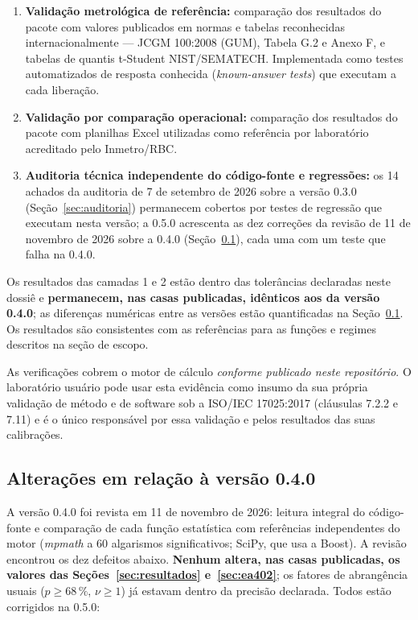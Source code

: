 \documentclass[11pt,a4paper]{article}
\newcommand{\docVersion}{0.5.0}
\newcommand{\auditDate}{7 de setembro de 2026}
\newcommand{\previousVersion}{0.4.0}
\newcommand{\auditedVersion}{0.3.0}
\newcommand{\reviewDate}{11 de novembro de 2026}
\begin{document}
\begin{enumerate}
  \item \textbf{Validação metrológica de referência:} comparação dos resultados do pacote com valores publicados em normas e tabelas reconhecidas internacionalmente --- JCGM 100:2008 (GUM), Tabela G.2 e Anexo F, e tabelas de quantis t-Student NIST/SEMATECH. Implementada como testes automatizados de resposta conhecida (\emph{known-answer tests}) que executam a cada liberação.
  \item \textbf{Validação por comparação operacional:} comparação dos resultados do pacote com planilhas Excel utilizadas como referência por laboratório acreditado pelo Inmetro/RBC.
  \item \textbf{Auditoria técnica independente do código-fonte e regressões:} os 14 achados da auditoria de \auditDate{} sobre a versão \auditedVersion{} (Seção~\ref{sec:auditoria}) permanecem cobertos por testes de regressão que executam nesta versão; a \docVersion{} acrescenta as dez correções da revisão de \reviewDate{} sobre a \previousVersion{} (Seção~\ref{sec:delta}), cada uma com um teste que falha na \previousVersion{}.
\end{enumerate}

Os resultados das camadas 1 e 2 estão dentro das tolerâncias declaradas neste dossiê e \textbf{permanecem, nas casas publicadas, idênticos aos da versão \previousVersion{}}; as diferenças numéricas entre as versões estão quantificadas na Seção~\ref{sec:delta}. Os resultados são consistentes com as referências para as funções e regimes descritos na seção de escopo.

As verificações cobrem o motor de cálculo \emph{conforme publicado neste repositório}. O laboratório usuário pode usar esta evidência como insumo da sua própria validação de método e de software sob a ISO/IEC 17025:2017 (cláusulas 7.2.2 e 7.11) e é o único responsável por essa validação e pelos resultados das suas calibrações.

\subsection{Alterações em relação à versão \previousVersion}
\label{sec:delta}

A versão \previousVersion{} foi revista em \reviewDate{}: leitura integral do código-fonte e comparação de cada função estatística com referências independentes do motor (\emph{mpmath} a 60 algarismos significativos; SciPy, que usa a Boost). A revisão encontrou os dez defeitos abaixo. \textbf{Nenhum altera, nas casas publicadas, os valores das Seções~\ref{sec:resultados} e~\ref{sec:ea402}}; os fatores de abrangência usuais (\(p \geq 68\,\%\), \(\nu \geq 1\)) já estavam dentro da precisão declarada. Todos estão corrigidos na \docVersion{}:
\end{document}
